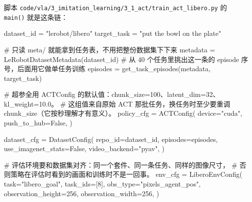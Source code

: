 \documentclass[
  chinese,
]{ctexart}
\newenvironment{Shaded}{\begin{snugshade}}{\end{snugshade}}
\newcommand{\CommentTok}[1]{\textcolor[rgb]{0.37,0.37,0.37}{#1}}
\newcommand{\DecValTok}[1]{\textcolor[rgb]{0.68,0.00,0.00}{#1}}
\newcommand{\NormalTok}[1]{\textcolor[rgb]{0.00,0.23,0.31}{#1}}
\newcommand{\OperatorTok}[1]{\textcolor[rgb]{0.37,0.37,0.37}{#1}}
\newcommand{\StringTok}[1]{\textcolor[rgb]{0.13,0.47,0.30}{#1}}
\newcommand{\VariableTok}[1]{\textcolor[rgb]{0.07,0.07,0.07}{#1}}
\begin{document}
脚本
\texttt{code/vla/3\_imitation\_learning/3\_1\_act/train\_act\_libero.py}
的 \texttt{main()} 就是这条链：

\begin{Shaded}
\begin{Highlighting}[]
\NormalTok{    dataset\_id }\OperatorTok{=} \StringTok{"lerobot/libero"}
\NormalTok{    target\_task }\OperatorTok{=} \StringTok{"put the bowl on the plate"}

    \CommentTok{\# 只读 meta/ 就能拿到任务表，不用把整份数据集下下来}
\NormalTok{    metadata }\OperatorTok{=}\NormalTok{ LeRobotDatasetMetadata(dataset\_id)}
    \CommentTok{\# 从 40 个任务里挑出这一条的 episode 序号，后面用它做单任务训练}
\NormalTok{    episodes }\OperatorTok{=}\NormalTok{ get\_task\_episodes(metadata, target\_task)}

    \CommentTok{\# 超参全用 ACTConfig 的默认值：chunk\_size=100、latent\_dim=32、kl\_weight=10.0。}
    \CommentTok{\# 这组值来自原始 ACT 那批任务，换任务时至少要重调 chunk\_size（它按秒理解才有意义）。}
\NormalTok{    policy\_cfg }\OperatorTok{=}\NormalTok{ ACTConfig(}
\NormalTok{        device}\OperatorTok{=}\StringTok{"cuda"}\NormalTok{,}
\NormalTok{        push\_to\_hub}\OperatorTok{=}\VariableTok{False}\NormalTok{,}
\NormalTok{    )}

\NormalTok{    dataset\_cfg }\OperatorTok{=}\NormalTok{ DatasetConfig(}
\NormalTok{        repo\_id}\OperatorTok{=}\NormalTok{dataset\_id,}
\NormalTok{        episodes}\OperatorTok{=}\NormalTok{episodes,}
\NormalTok{        use\_imagenet\_stats}\OperatorTok{=}\VariableTok{False}\NormalTok{,}
\NormalTok{        video\_backend}\OperatorTok{=}\StringTok{"pyav"}\NormalTok{,}
\NormalTok{    )}

    \CommentTok{\# 评估环境要和数据集对齐：同一个套件、同一条任务、同样的图像尺寸，}
    \CommentTok{\# 否则策略在评估时看到的画面和训练时不是一回事。}
\NormalTok{    env\_cfg }\OperatorTok{=}\NormalTok{ LiberoEnvConfig(}
\NormalTok{        task}\OperatorTok{=}\StringTok{"libero\_goal"}\NormalTok{,}
\NormalTok{        task\_ids}\OperatorTok{=}\NormalTok{[}\DecValTok{8}\NormalTok{],}
\NormalTok{        obs\_type}\OperatorTok{=}\StringTok{"pixels\_agent\_pos"}\NormalTok{,}
\NormalTok{        observation\_height}\OperatorTok{=}\DecValTok{256}\NormalTok{,}
\NormalTok{        observation\_width}\OperatorTok{=}\DecValTok{256}\NormalTok{,}
\NormalTok{    )}


\end{Highlighting}
\end{Shaded}
\end{document}
